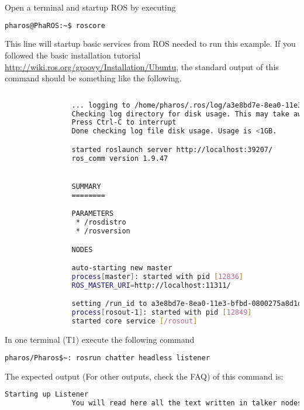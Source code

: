 \documentclass[a4paper,10pt,twoside]{book}
\begin{document}
			Open a terminal and startup ROS by executing
			
			\begin{lstlisting}[language=bash,title={Starting up ROS}]
				pharos@PhaROS:~$ roscore
			\end{lstlisting}
			
			This line will startup basic services from ROS needed to run this example. If you followed the basic installation tutorial 
			\hyperlink{http://wiki.ros.org/groovy/Installation/Ubuntu}{http://wiki.ros.org/groovy/Installation/Ubuntu},
			the standard output of this command should be something like the following.
			
			\begin{lstlisting}[language=bash,title={Starting up ROS - Output}]
				
				... logging to /home/pharos/.ros/log/a3e8bd7e-8ea0-11e3-bfbd-0800275a8d1d/roslaunch-PhaROS-12822.log
				Checking log directory for disk usage. This may take awhile.
				Press Ctrl-C to interrupt
				Done checking log file disk usage. Usage is <1GB.

				started roslaunch server http://localhost:39207/
				ros_comm version 1.9.47


				SUMMARY
				========

				PARAMETERS
				 * /rosdistro
				 * /rosversion

				NODES

				auto-starting new master
				process[master]: started with pid [12836]
				ROS_MASTER_URI=http://localhost:11311/

				setting /run_id to a3e8bd7e-8ea0-11e3-bfbd-0800275a8d1d
				process[rosout-1]: started with pid [12849]
				started core service [/rosout]
			\end{lstlisting}
			
			
			
			In one terminal (T1) execute the following command 
			
			\begin{lstlisting}[language=bash,title={Starting up listener}]
				pharos/Pharos$~: rosrun chatter headless listener
			\end{lstlisting}
			
			
			The expected output (For other outputs, check the FAQ) of this command is: 
			
			\begin{lstlisting}[language=bash,title={Listener output}]
				Starting up Listener 
				You will read here all the text written in talker nodes
			\end{lstlisting}
			
\end{document}

